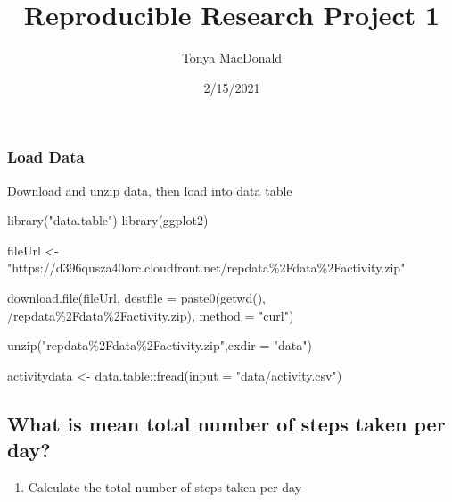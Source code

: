 \documentclass[
]{article}
\title{Reproducible Research Project 1}
\author{Tonya MacDonald}
\date{2/15/2021}
\newenvironment{Shaded}{\begin{snugshade}}{\end{snugshade}}
\newcommand{\AttributeTok}[1]{\textcolor[rgb]{0.77,0.63,0.00}{#1}}
\newcommand{\CommentTok}[1]{\textcolor[rgb]{0.56,0.35,0.01}{\textit{#1}}}
\newcommand{\FunctionTok}[1]{\textcolor[rgb]{0.00,0.00,0.00}{#1}}
\newcommand{\NormalTok}[1]{#1}
\newcommand{\OtherTok}[1]{\textcolor[rgb]{0.56,0.35,0.01}{#1}}
\newcommand{\SpecialCharTok}[1]{\textcolor[rgb]{0.00,0.00,0.00}{#1}}
\newcommand{\StringTok}[1]{\textcolor[rgb]{0.31,0.60,0.02}{#1}}
\providecommand{\tightlist}{%
  \setlength{\itemsep}{0pt}\setlength{\parskip}{0pt}}
\begin{document}
\maketitle

\hypertarget{load-data}{%
\subsubsection{Load Data}\label{load-data}}

Download and unzip data, then load into data table

\begin{Shaded}
\begin{Highlighting}[]
\FunctionTok{library}\NormalTok{(}\StringTok{"data.table"}\NormalTok{)}
\FunctionTok{library}\NormalTok{(ggplot2)}

\NormalTok{fileUrl }\OtherTok{\textless{}{-}} \StringTok{"https://d396qusza40orc.cloudfront.net/repdata\%2Fdata\%2Factivity.zip"}

\FunctionTok{download.file}\NormalTok{(fileUrl, }\AttributeTok{destfile =} \FunctionTok{paste0}\NormalTok{(}\FunctionTok{getwd}\NormalTok{(), }\StringTok{\textquotesingle{}/repdata\%2Fdata\%2Factivity.zip\textquotesingle{}}\NormalTok{), }\AttributeTok{method =} \StringTok{"curl"}\NormalTok{)}

\FunctionTok{unzip}\NormalTok{(}\StringTok{"repdata\%2Fdata\%2Factivity.zip"}\NormalTok{,}\AttributeTok{exdir =} \StringTok{"data"}\NormalTok{)}

\NormalTok{activitydata }\OtherTok{\textless{}{-}}\NormalTok{ data.table}\SpecialCharTok{::}\FunctionTok{fread}\NormalTok{(}\AttributeTok{input =} \StringTok{"data/activity.csv"}\NormalTok{)}
\end{Highlighting}
\end{Shaded}

\hypertarget{what-is-mean-total-number-of-steps-taken-per-day}{%
\subsection{What is mean total number of steps taken per
day?}\label{what-is-mean-total-number-of-steps-taken-per-day}}

\begin{enumerate}
\def\labelenumi{\arabic{enumi}.}
\tightlist
\item
  Calculate the total number of steps taken per day
\end{enumerate}

\begin{Shaded}
\end{Shaded}
\end{document}
